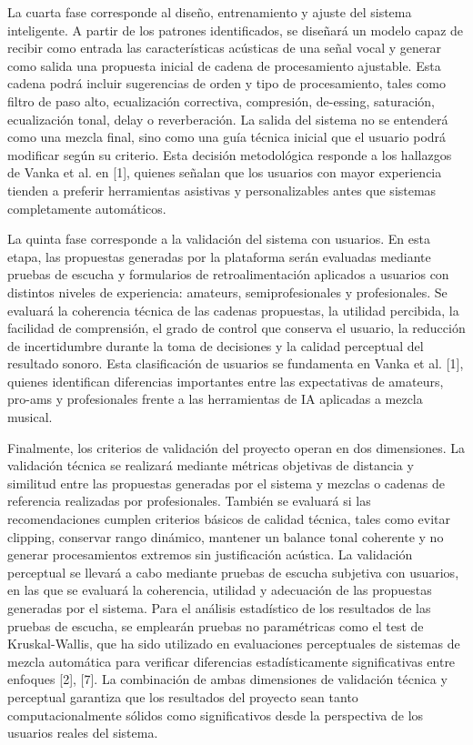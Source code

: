 \documentclass[12pt]{article}
\begin{document}
La cuarta fase corresponde al diseño, entrenamiento y ajuste del sistema inteligente. A partir de los patrones identificados, se diseñará un modelo capaz de recibir como entrada las características acústicas de una señal vocal y generar como salida una propuesta inicial de cadena de procesamiento ajustable. Esta cadena podrá incluir sugerencias de orden y tipo de procesamiento, tales como filtro de paso alto, ecualización correctiva, compresión, de-essing, saturación, ecualización tonal, delay o reverberación. La salida del sistema no se entenderá como una mezcla final, sino como una guía técnica inicial que el usuario podrá modificar según su criterio. Esta decisión metodológica responde a los hallazgos de Vanka et al. en [1], quienes señalan que los usuarios con mayor experiencia tienden a preferir herramientas asistivas y personalizables antes que sistemas completamente automáticos.

La quinta fase corresponde a la validación del sistema con usuarios. En esta etapa, las propuestas generadas por la plataforma serán evaluadas mediante pruebas de escucha y formularios de retroalimentación aplicados a usuarios con distintos niveles de experiencia: amateurs, semiprofesionales y profesionales. Se evaluará la coherencia técnica de las cadenas propuestas, la utilidad percibida, la facilidad de comprensión, el grado de control que conserva el usuario, la reducción de incertidumbre durante la toma de decisiones y la calidad perceptual del resultado sonoro. Esta clasificación de usuarios se fundamenta en Vanka et al. [1], quienes identifican diferencias importantes entre las expectativas de amateurs, pro-ams y profesionales frente a las herramientas de IA aplicadas a mezcla musical.

Finalmente, los criterios de validación del proyecto operan en dos dimensiones. La validación técnica se realizará mediante métricas objetivas de distancia y similitud entre las propuestas generadas por el sistema y mezclas o cadenas de referencia realizadas por profesionales. También se evaluará si las recomendaciones cumplen criterios básicos de calidad técnica, tales como evitar clipping, conservar rango dinámico, mantener un balance tonal coherente y no generar procesamientos extremos sin justificación acústica. La validación perceptual se llevará a cabo mediante pruebas de escucha subjetiva con usuarios, en las que se evaluará la coherencia, utilidad y adecuación de las propuestas generadas por el sistema. Para el análisis estadístico de los resultados de las pruebas de escucha, se emplearán pruebas no paramétricas como el test de Kruskal-Wallis, que ha sido utilizado en evaluaciones perceptuales de sistemas de mezcla automática para verificar diferencias estadísticamente significativas entre enfoques [2], [7]. La combinación de ambas dimensiones de validación técnica y perceptual garantiza que los resultados del proyecto sean tanto computacionalmente sólidos como significativos desde la perspectiva de los usuarios reales del sistema.
\end{document}
